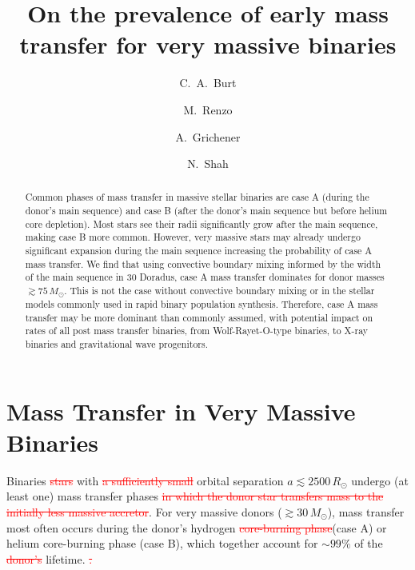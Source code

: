 \documentclass[twocolumn]{aastex63}
\newcommand{\cut}[1]{\textcolor{red}{\sout{#1}}}
\begin{document}
\title{On the prevalence of early mass transfer for very massive binaries}

\author[0009-0008-2061-4946]{C.~A.~Burt}

\author[0000-0002-6718-9472]{M.~Renzo}

\author[0000-0002-2215-1841]{A.~Grichener}

\author[0000-0002-8465-8090]{N.~Shah}




\begin{abstract}
  Common phases of mass transfer in massive stellar binaries are case
  A (during the donor's main sequence) and case B (after the donor's
  main sequence but before helium core depletion). Most stars see
  their radii significantly grow after the main sequence, making case
  B more common. However, very massive stars may already undergo
  significant expansion during the main sequence increasing the
  probability of case A mass transfer. We find that using convective
  boundary mixing informed by the width of the main sequence in 30
  Doradus, case A mass transfer dominates for donor masses
  $\gtrsim 75 \, M_{\odot}$. This is not the case without convective
  boundary mixing or in the stellar models commonly used in rapid
  binary population synthesis.  Therefore, case A mass transfer may be
  more dominant than commonly assumed, with potential impact on rates
  of all post mass transfer binaries, from Wolf-Rayet-O-type binaries,
  to X-ray binaries and gravitational wave progenitors.
\end{abstract}

\section{Mass Transfer in Very Massive Binaries}

Binaries \cut{stars} with \cut{a sufficiently small} orbital
separation $a\lesssim2500\,R_{\odot}$ undergo (at least one) mass
transfer phases \citep{sana:12}\cut{in which the donor star transfers
  mass to the initially less massive accretor}. For very massive
donors ($ \gtrsim 30 \, M_{\odot}$), mass transfer most often occurs
during the donor's hydrogen \cut{core-burning phase}(case A) or helium
core-burning phase (case B), which together account for $\sim99\%$ of
the \cut{donor's} lifetime. \cut{\citep{kippenhahn:67}.}
\end{document}
